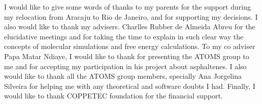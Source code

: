 \documentclass[
	12pt,				%
	openany,			%
	oneside,			%
	a4paper,			%
	english,			%
	brazil				%
	]{abntex2}
\begin{document}
\begin{agradecimentos}
I would like to give some words of thanks to my parents for the support during my relocation from Aracaju to Rio de Janeiro, and for supporting my decisions. I also would like to thank my advisers. Charlles Rubber de Almeida Abreu for the elucidative meetings and for taking the time to explain in such clear way the concepts of molecular simulations and free energy calculations. To my co adviser Papa Matar Ndiaye, I would like to thank for presenting the ATOMS group to me and for accepting my participation in his project about asphaltenes. I also would like to thank all the ATOMS group members, specially Ana Jorgelina Silveira  for helping me with any theoretical and software doubts I had. Finally, I would like to thank COPPETEC foundation for the financial support. 
\end{agradecimentos}



\setlength{\absparsep}{18pt} %
%
\end{document}
